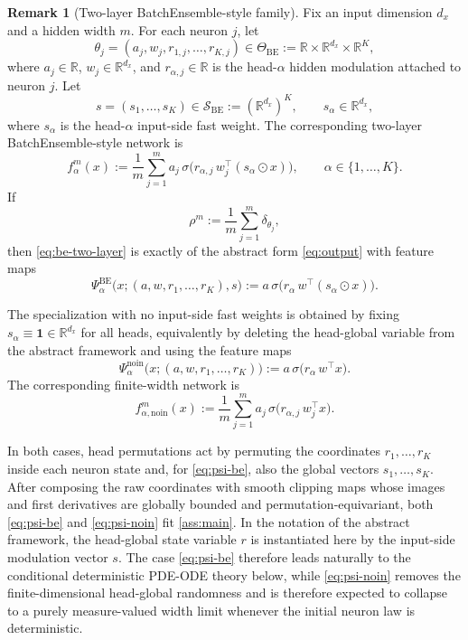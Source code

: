 \documentclass[11pt]{article}
\theoremstyle{definition}
\newtheorem{remark}[theorem]{Remark}
\newcommand{\R}{\mathbb{R}}
\begin{document}
\begin{remark}[Two-layer BatchEnsemble-style family]
\label{rem:be-family}
Fix an input dimension $d_x$ and a hidden width $m$. For each neuron $j$, let
\[
  \theta_j
  =
  (a_j,w_j,r_{1,j},\dots,r_{K,j})
  \in
  \Theta_{\mathrm{BE}}
  :=
  \R\times\R^{d_x}\times\R^K,
\]
where $a_j\in\R$, $w_j\in\R^{d_x}$, and $r_{\alpha,j}\in\R$ is the
head-$\alpha$ hidden modulation attached to neuron $j$. Let
\[
  s=(s_1,\dots,s_K)\in\mathcal S_{\mathrm{BE}}
  :=
  (\R^{d_x})^K,
  \qquad
  s_\alpha\in\R^{d_x},
\]
where $s_\alpha$ is the head-$\alpha$ input-side fast weight. The corresponding
two-layer BatchEnsemble-style network is
\begin{equation}
  f_\alpha^m(x)
  :=
  \frac1m\sum_{j=1}^m
  a_j\,
  \sigma\!\bigl(
    r_{\alpha,j}\,w_j^\top(s_\alpha\odot x)
  \bigr),
  \qquad
  \alpha\in\{1,\dots,K\}.
  \label{eq:be-two-layer}
\end{equation}
If
\[
  \rho^m:=\frac1m\sum_{j=1}^m \delta_{\theta_j},
\]
then \eqref{eq:be-two-layer} is exactly of the abstract form
\eqref{eq:output} with feature maps
\begin{equation}
  \Psi_\alpha^{\mathrm{BE}}
  \bigl(x;(a,w,r_1,\dots,r_K),s\bigr)
  :=
  a\,\sigma\!\bigl(
    r_\alpha\,w^\top(s_\alpha\odot x)
  \bigr).
  \label{eq:psi-be}
\end{equation}

The specialization with no input-side fast weights is obtained by fixing
$s_\alpha\equiv \mathbf 1\in\R^{d_x}$ for all heads, equivalently by deleting the
head-global variable from the abstract framework and using the feature maps
\begin{equation}
  \Psi_\alpha^{\mathrm{noin}}
  \bigl(x;(a,w,r_1,\dots,r_K)\bigr)
  :=
  a\,\sigma\!\bigl(
    r_\alpha\,w^\top x
  \bigr).
  \label{eq:psi-noin}
\end{equation}
The corresponding finite-width network is
\begin{equation}
  f_{\alpha,\mathrm{noin}}^m(x)
  :=
  \frac1m\sum_{j=1}^m
  a_j\,
  \sigma\!\bigl(
    r_{\alpha,j}\,w_j^\top x
  \bigr).
  \label{eq:be-two-layer-noin}
\end{equation}

In both cases, head permutations act by permuting the coordinates
$r_1,\dots,r_K$ inside each neuron state and, for \eqref{eq:psi-be}, also the
global vectors $s_1,\dots,s_K$. After composing the raw coordinates with smooth
clipping maps whose images and first derivatives are globally bounded and
permutation-equivariant, both \eqref{eq:psi-be} and \eqref{eq:psi-noin} fit
\cref{ass:main}. In the notation of the abstract framework, the head-global
state variable $r$ is instantiated here by the input-side modulation vector $s$.
The case \eqref{eq:psi-be} therefore leads naturally to the conditional
deterministic PDE-ODE theory below, while \eqref{eq:psi-noin} removes the
finite-dimensional head-global randomness and is therefore expected to collapse
to a purely measure-valued width limit whenever the initial neuron law is
deterministic.
\end{remark}
\end{document}
